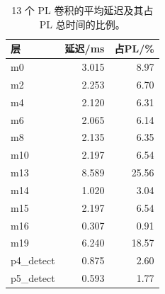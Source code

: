 \begin{table}[t]
\centering
\caption{13 个 PL 卷积的平均延迟及其占 PL 总时间的比例。}
\label{tab:layer-latency}
\small
\begin{tabular}{lrr}
\toprule
层 & 延迟/ms & 占PL/\% \\
\midrule
m0 & 3.015 & 8.97 \\
m2 & 2.253 & 6.70 \\
m4 & 2.120 & 6.31 \\
m6 & 2.065 & 6.14 \\
m8 & 2.135 & 6.35 \\
m10 & 2.197 & 6.54 \\
m13 & 8.589 & 25.56 \\
m14 & 1.020 & 3.04 \\
m15 & 2.197 & 6.54 \\
m16 & 0.307 & 0.91 \\
m19 & 6.240 & 18.57 \\
p4\_detect & 0.875 & 2.60 \\
p5\_detect & 0.593 & 1.77 \\
\bottomrule
\end{tabular}
\end{table}
